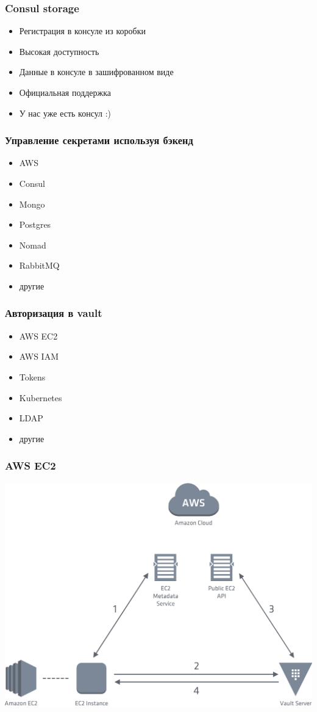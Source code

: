 \documentclass[mathserif,serif]{beamer}
\begin{document}
\begin{frame}
	\frametitle{Consul storage}
	\begin{itemize}
		\item{Регистрация в консуле из коробки}
		\item{Высокая доступность}
		\item{Данные в консуле в зашифрованном виде}
		\item{Официальная поддержка}
		\item{У нас уже есть консул :)}
	\end{itemize}
\end{frame}

\begin{frame}
	\frametitle{Управление секретами используя бэкенд}
	\begin{itemize}
		\item{AWS}
		\item{Consul}
		\item{Mongo}
		\item{Postgres}
		\item{Nomad}
		\item{RabbitMQ}
		\item{другие}
	\end{itemize}
\end{frame}

\begin{frame}
	\frametitle{Авторизация в vault}
	\begin{itemize}
		\item{AWS EC2}
		\item{AWS IAM}
		\item{Tokens}
		\item{Kubernetes}
		\item{LDAP}
		\item{другие}
	\end{itemize}
\end{frame}

\begin{frame}
	\frametitle{AWS EC2}
	\includegraphics[width=0.8\linewidth]{ec2.png}
\end{frame}
\end{document}
